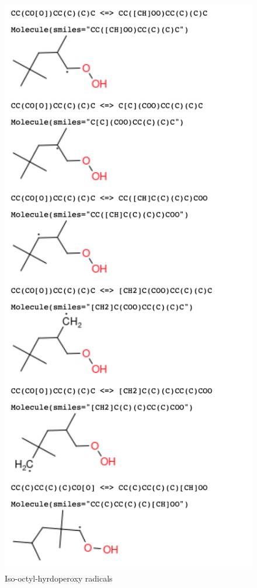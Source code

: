 \begin{figure}[!hbp]
    \centering
    \includegraphics[scale=0.45, keepaspectratio]{images/iso-octyl-QOOH.png}
    \caption{Iso-octyl-hyrdoperoxy radicals }
    \label{fig:ic8-QOOH}
\end{figure}

